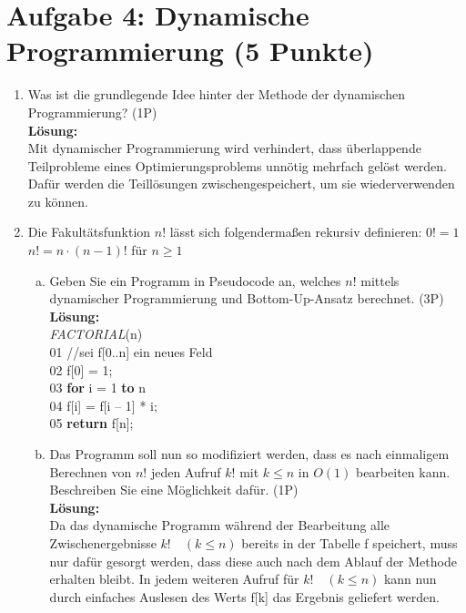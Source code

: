 \documentclass{scrartcl}
\begin{document}
\section*{Aufgabe 4: Dynamische Programmierung (5 Punkte)}
\begin{enumerate}[(1)]

\item Was ist die grundlegende Idee hinter der Methode der dynamischen Programmierung? (1P)\\
\textbf{Lösung:}\\
Mit dynamischer Programmierung wird verhindert, dass überlappende Teilprobleme eines Optimierungsproblems unnötig mehrfach gelöst werden. Dafür werden die Teillösungen zwischengespeichert, um sie wiederverwenden zu können.

\item Die Fakultätsfunktion $n!$ lässt sich folgendermaßen rekursiv definieren: \newline
$0! = 1$\newline
$n! = n\cdot(n-1)!$ 	für $n \geq 1$
\begin{enumerate}[(a)]
\item Geben Sie ein Programm in Pseudocode an, welches $n!$  mittels dynamischer Programmierung und Bottom-Up-Ansatz berechnet. (3P)\\
\textbf{Lösung:}\\
\textit{FACTORIAL}(n)\\
01 \tab //sei f[0..n] ein neues Feld\\
02 \tab f[0] = 1;\\
03 \tab \textbf{for} i = 1 \textbf{to} n\\
04 \tab \tab f[i] = f[i – 1] * i;\\
05 \tab \textbf{return} f[n];\\
\item Das Programm soll nun so modifiziert werden, dass es nach einmaligem Berechnen von $n!$ jeden Aufruf $k!$ mit $k \leq n$ in $O(1)$ bearbeiten kann. Beschreiben Sie eine Möglichkeit dafür. (1P)\\
\textbf{Lösung:}\\
Da das dynamische Programm während der Bearbeitung alle Zwischenergebnisse $k!\quad (k \leq n)$ bereits in der Tabelle f speichert, muss nur dafür gesorgt werden, dass diese auch nach dem Ablauf der Methode erhalten bleibt. In jedem weiteren Aufruf für $k!\quad (k \leq n)$ kann nun durch einfaches Auslesen des Werts f[k] das Ergebnis geliefert werden.
\end{enumerate}
\end{enumerate}
\end{document}

